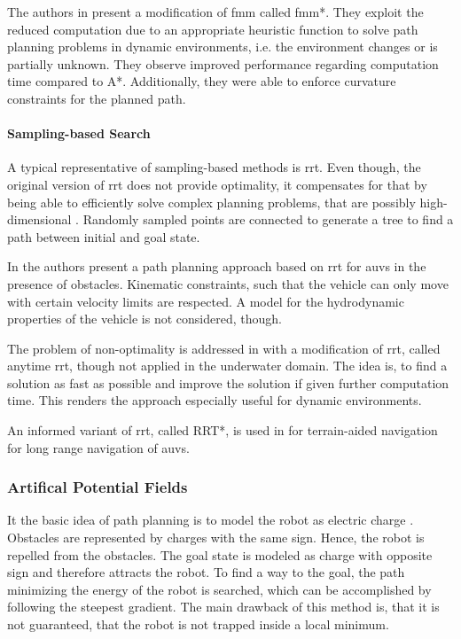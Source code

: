 The authors in \cite{Petres09} present a modification of \ac{fmm} called \acs{fmm}*. They exploit the reduced computation due to an appropriate heuristic function to solve path planning problems in dynamic environments, i.e. the environment changes or is partially unknown. They observe improved performance regarding computation time compared to A*. Additionally, they were able to enforce curvature constraints for the planned path.

\paragraph{Sampling-based Search}

A typical representative of sampling-based methods is \ac{rrt}. Even though, the original version of \ac{rrt} does not provide optimality, it compensates for that by being able to efficiently solve complex planning problems, that are possibly high-dimensional \cite{Devaurs16}. Randomly sampled points are connected to generate a tree to find a path between initial and goal state.

In \cite{Young13} the authors present a path planning approach based on \ac{rrt} for \acp{auv} in the presence of obstacles. Kinematic constraints, such that the vehicle can only move with certain velocity limits are respected. A model for the hydrodynamic properties of the vehicle is not considered, though.

The problem of non-optimality is addressed in \cite{Karaman11} with a modification of \ac{rrt}, called anytime \ac{rrt}, though not applied in the underwater domain. The idea is, to find a solution as fast as possible and improve the solution if given further computation time. This renders the approach especially useful for dynamic environments.

An informed variant of \ac{rrt}, called RRT*, is used in \cite{Ma18} for terrain-aided navigation for long range navigation of \acp{auv}.

\subsubsection{Artifical Potential Fields}
It the basic idea of path planning is to model the robot as electric charge \cite{Gomez15}. Obstacles are represented by charges with the same sign. Hence, the robot is repelled from the obstacles. The goal state is modeled as charge with opposite sign and therefore attracts the robot. To find a way to the goal, the path minimizing the energy of the robot is searched, which can be accomplished by following the steepest gradient. The main drawback of this method is, that it is not guaranteed, that the robot is not trapped inside a local minimum. 

